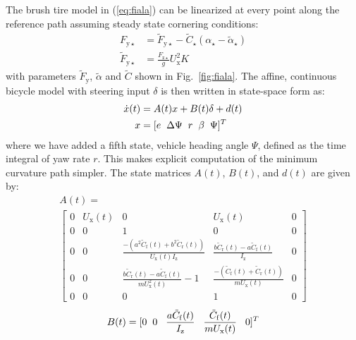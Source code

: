 \documentclass[twocolumn,10pt, final]{asme2e}
\begin{document}
The brush tire model in (\ref{eq:fiala}) can be linearized at every point along the reference path assuming steady state cornering conditions:
\begin{subequations}
\begin{align}
	F_\mathrm{y\star} &= \tilde{F}_\mathrm{y\star} - \tilde{C}_\star(\alpha_\star - \tilde{\alpha}_\star) \\
	\tilde{F}_\mathrm{y\star} &= \frac{F_\mathrm{z\star}}{g} U_\mathrm{x}^2K
\label{eqn:ftil}
\end{align}
\end{subequations}
with parameters $\tilde{F}_\mathrm{y}$, $\tilde{\alpha}$ and $\tilde{C}$ shown in Fig.~\ref{fig:fiala}. The affine, continuous bicycle model with
steering input $\delta$ is then written in state-space form as:
\begin{subequations}
\label{eq:cts}
\begin{align}
	\dot{x}(t) &= A(t) x + B(t)\delta + d(t)\\
	 x &= [e \hspace{2mm} \Delta\Psi \hspace{2mm} r \hspace{2mm} \beta \hspace{2mm} \Psi]^T
\end{align}
\end{subequations}
where we have added a fifth state, vehicle heading angle $\Psi$, defined as the time integral of yaw rate $r$.
 This makes explicit computation of the minimum curvature path simpler. The state matrices $A(t)$, $B(t)$, and $d(t)$ 
 are given by:
\begin{multline}
\label{eqn:Amatrix}
A(t)  =  \\
\left[\begin{matrix}
  0 & U_\mathrm{x}(t) & 0 & U_\mathrm{x}(t) & 0\\ 
  0 & 0 & 1 & 0 & 0 \\ 
  0 & 0  & \frac{-(a^2\tilde{C}_\mathrm{f}(t)+b^2\tilde{C}_\mathrm{r}(t))}{U_\mathrm{x}(t)I_\mathrm{z}} & \frac{b\tilde{C}_\mathrm{r}(t) - a\tilde{C}_\mathrm{f}(t)}{I_\mathrm{z}} & 0 \\
  0 & 0  & \frac{b\tilde{C}_\mathrm{r}(t)-a\tilde{C}_\mathrm{f}(t)}{mU_\mathrm{x}^2(t)}-1 & \frac{-(\tilde{C}_\mathrm{f}(t) + \tilde{C}_\mathrm{r}(t))}{mU_\mathrm{x}(t)} & 0 \\
  0 & 0 & 0 & 1 & 0
 \end{matrix}\right]
 \end{multline}
\begin{align}
B(t) =[0 \hspace{2 mm} 0 \hspace{3 mm} \frac{a \tilde{C}_\mathrm{f}(t)}{I_\mathrm{z}} \hspace{3 mm}  \frac{\tilde{C}_\mathrm{f}(t)}{mU_\mathrm{x}(t)} \hspace{3mm} 0]^T
\end {align}
\end{document}
